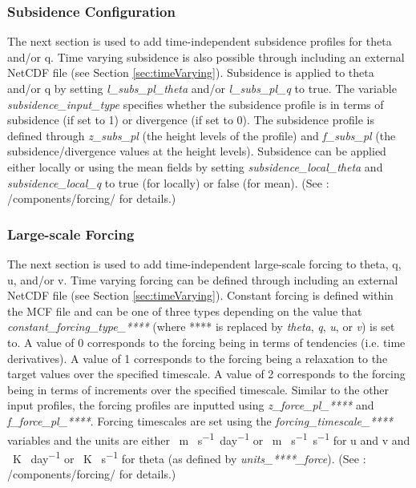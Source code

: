 \subsubsection{Subsidence Configuration}
The next section is used to add time-independent subsidence profiles for theta and/or q. Time varying subsidence is also possible through including an external NetCDF file (see Section \ref{sec:timeVarying}). Subsidence is applied to theta and/or q by setting \textit{l\_subs\_pl\_theta} and/or \textit{l\_subs\_pl\_q} to true. The variable \textit{subsidence\_input\_type} specifies whether the subsidence profile is in terms of subsidence (if set to 1) or divergence (if set to 0). The subsidence profile is defined through \textit{z\_subs\_pl} (the height levels of the profile) and \textit{f\_subs\_pl} (the subsidence/divergence values at the height levels). Subsidence can be applied either locally or using the mean fields by setting \textit{subsidence\_local\_theta} and \textit{subsidence\_local\_q} to true (for locally) or false (for mean). (See \cite{moncCode}: /components/forcing/ for details.)

\subsubsection{Large-scale Forcing}
The next section is used to add time-independent large-scale forcing to theta, q, u, and/or v. Time varying forcing can be defined through including an external NetCDF file (see Section \ref{sec:timeVarying}). Constant forcing is defined within the MCF file and can be one of three types depending on the value that \textit{constant\_forcing\_type\_****} (where **** is replaced by \textit{theta}, \textit{q}, \textit{u}, or \textit{v}) is set to. A value of 0 corresponds to the forcing being in terms of tendencies (i.e. time derivatives). A value of 1 corresponds to the forcing being a relaxation to the target values over the specified timescale. A value of 2 corresponds to the forcing being in terms of increments over the specified timescale. Similar to the other input profiles, the forcing profiles are inputted using \textit{z\_force\_pl\_****} and \textit{f\_force\_pl\_****}. Forcing timescales are set using the \textit{forcing\_timescale\_****} variables and the units are either \SI{}{m} \SI{}{s^{-1} day^{-1}} or \SI{}{m} \SI{}{s^{-1} s^{-1}} for u and v and \SI{}{K} \SI{}{day^{-1}} or \SI{}{K} \SI{}{s^{-1}} for theta (as defined by \textit{units\_****\_force}). (See \cite{moncCode}: /components/forcing/ for details.)

